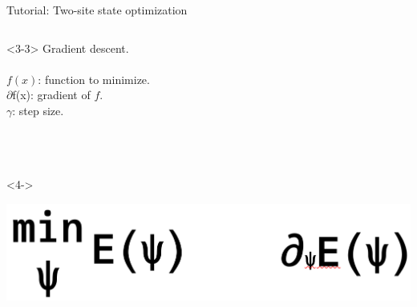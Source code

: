 \begin{frame}[fragile]{Tutorial: Two-site state optimization}
\begin{columns}
\begin{column}{5cm}
\begin{onlyenv}<3-3>
Gradient descent. \\
~\\
$f(x)$: function to minimize. \\
$\partial$f(x): gradient of $f$. \\
$\gamma$: step size. \\
~\\
~\\
~\\
\end{onlyenv}

\begin{onlyenv}<4->
\vspace*{0.0cm}
\begin{center}
\includegraphics[width=1.0\textwidth]{
  slides/assets/min_grad_E_psi.png
}
\end{center}
~\\
~\\
~\\
\vspace*{0.0cm}
\end{onlyenv}

\end{column}

\end{columns}

\end{frame}
